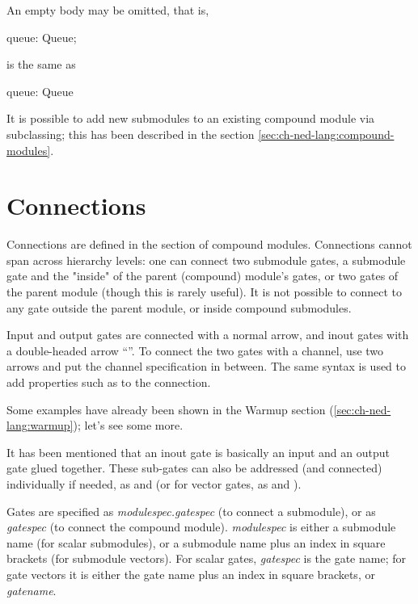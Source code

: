An empty body may be omitted, that is,

\begin{ned}
      queue: Queue;
\end{ned}

is the same as

\begin{ned}
      queue: Queue {
      }
\end{ned}

It is possible to add new submodules to an existing compound module via
subclassing; this has been described in the section
\ref{sec:ch-ned-lang:compound-modules}.



\section{Connections}
\label{sec:ch-ned-lang:connections}

Connections are defined in the  section of compound
modules. Connections cannot span across hierarchy levels: one can connect
two submodule gates, a submodule gate and the "inside" of the parent
(compound) module's gates, or two gates of the parent module (though this
is rarely useful). It is not possible to connect to any gate outside the
parent module, or inside compound submodules.

Input and output gates are connected with a normal arrow, and inout gates
with a double-headed arrow ``\ttt{<-{}->}''. To connect the two gates
with a channel, use two arrows and put the channel specification in between.
The same syntax is used to add properties such as  to the
connection.

Some examples have already been shown in the Warmup section
(\ref{sec:ch-ned-lang:warmup}); let's see some more.



It has been mentioned that an inout gate is basically an input and an
output gate glued together. These sub-gates can also be addressed (and
connected) individually if needed, as  and  (or
for vector gates, as  and ).



Gates are specified as \textit{modulespec.gatespec} (to connect a submodule),
or as \textit{gatespec} (to connect the compound module). \textit{modulespec}
is either a submodule name (for scalar submodules), or a submodule name plus
an index in square brackets (for submodule vectors). For scalar gates,
\textit{gatespec} is the gate name; for gate vectors it is either the gate name
plus an index in square brackets, or \textit{gatename}\ttt{++}.

